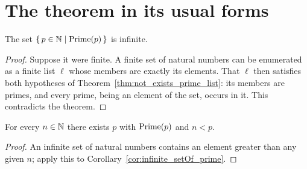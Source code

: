 \section{The theorem in its usual forms}

\begin{corollary}
  \leanok
  \label{cor:infinite_setOf_prime}
  The set $\{\, p \in \mathbb{N} \mid \mathrm{Prime}(p) \,\}$ is infinite.
\end{corollary}
\begin{proof}
  \leanok
  Suppose it were finite. A finite set of natural numbers can be enumerated as a
  finite list $\ell$ whose members are exactly its elements. That $\ell$ then
  satisfies both hypotheses of Theorem~\ref{thm:not_exists_prime_list}: its
  members are primes, and every prime, being an element of the set, occurs in
  it. This contradicts the theorem.
\end{proof}

\begin{corollary}
  \leanok
  \label{cor:exists_prime_gt}
  For every $n \in \mathbb{N}$ there exists $p$ with $\mathrm{Prime}(p)$ and $n < p$.
\end{corollary}
\begin{proof}
  \leanok
  An infinite set of natural numbers contains an element greater than any given
  $n$; apply this to Corollary~\ref{cor:infinite_setOf_prime}.
\end{proof}

